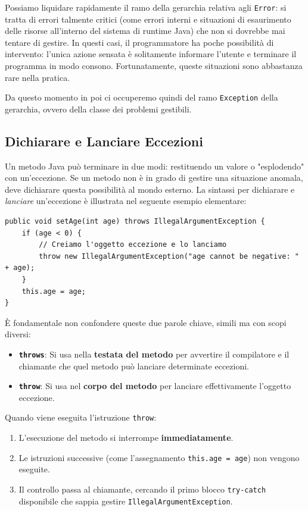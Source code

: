 Possiamo liquidare rapidamente il ramo della gerarchia relativa agli \texttt{Error}: si tratta di errori talmente critici (come errori interni e situazioni di esaurimento delle risorse all'interno del sistema di runtime Java) che non si dovrebbe mai tentare di gestire. In questi casi, il programmatore ha poche possibilità di intervento: l'unica azione sensata è solitamente informare l'utente e terminare il programma in modo consono. Fortunatamente, queste situazioni sono abbastanza rare nella pratica.

Da questo momento in poi ci occuperemo quindi del ramo \texttt{Exception} della gerarchia, ovvero della classe dei problemi gestibili.

\subsection{Dichiarare e Lanciare Eccezioni}

Un metodo Java può terminare in due modi: restituendo un valore o "esplodendo" con un'eccezione. Se un metodo non è in grado di gestire una situazione anomala, deve dichiarare questa possibilità al mondo esterno. La sintassi per dichiarare e \textit{lanciare} un'eccezione è illustrata nel seguente esempio elementare: 

\begin{lstlisting}[caption={Esempio di metodo che lancia un'eccezione}]
public void setAge(int age) throws IllegalArgumentException {
    if (age < 0) {
        // Creiamo l'oggetto eccezione e lo lanciamo
        throw new IllegalArgumentException("age cannot be negative: " + age);
    }
    this.age = age;
}
\end{lstlisting}

È fondamentale non confondere queste due parole chiave, simili ma con scopi diversi:
\begin{itemize}
    \item \textbf{\texttt{throws}}: Si usa nella \textbf{testata del metodo} per avvertire il compilatore e il chiamante che quel metodo può lanciare determinate eccezioni.
    \item \textbf{\texttt{throw}}: Si usa nel \textbf{corpo del metodo} per lanciare effettivamente l'oggetto eccezione.
\end{itemize}
\vspace{\baselineskip}
Quando viene eseguita l'istruzione \texttt{throw}:
\begin{enumerate}
    \item L'esecuzione del metodo si interrompe \textbf{immediatamente}.
    \item Le istruzioni successive (come l'assegnamento \texttt{this.age = age}) non vengono eseguite.
    \item Il controllo passa al chiamante, cercando il primo blocco \texttt{try-catch} disponibile che sappia gestire \texttt{IllegalArgumentException}.
\end{enumerate}

